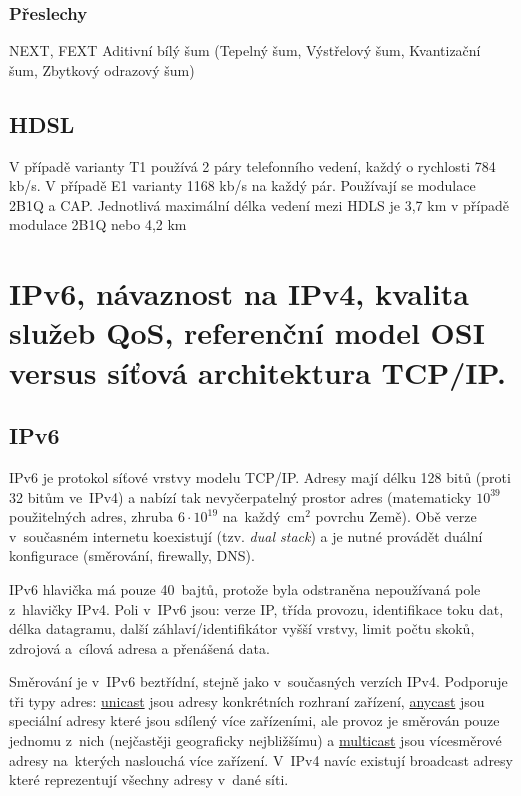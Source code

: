 \subsubsection{Přeslechy}
NEXT, FEXT
Aditivní bílý šum (Tepelný šum, Výstřelový šum, Kvantizační šum, Zbytkový odrazový šum)

\subsection{HDSL}
V případě varianty T1 používá 2 páry telefonního vedení, každý o rychlosti 784 kb/s. V případě E1 varianty 1168 kb/s na každý pár. Používají se modulace 2B1Q a CAP. Jednotlivá maximální délka vedení mezi HDLS je 3,7 km v případě modulace 2B1Q nebo 4,2 km


\clearpage
\section{IPv6, návaznost na IPv4, kvalita služeb QoS, referenční model OSI versus síťová architektura TCP/IP.}


\subsection{IPv6}

IPv6 je protokol síťové vrstvy modelu TCP/IP.
Adresy mají délku 128 bitů (proti 32 bitům ve~IPv4) a nabízí tak nevyčerpatelný prostor adres (matematicky $10^{39}$ použitelných adres, zhruba $6 \cdot 10^{19}$ na~každý~cm$^2$ povrchu Země).
Obě verze v~současném internetu koexistují (tzv. \emph{dual stack}) a je nutné provádět duální konfigurace (směrování, firewally, DNS).

IPv6 hlavička má pouze 40~bajtů, protože byla odstraněna nepoužívaná pole z~hlavičky IPv4.
Poli v~IPv6 jsou: verze IP, třída provozu, identifikace toku dat, délka datagramu, další záhlaví/identifikátor vyšší vrstvy, limit počtu skoků, zdrojová a~cílová adresa a přenášená data.

Směrování je v~IPv6 beztřídní, stejně jako v~současných verzích IPv4.
Podporuje tři typy adres: \underline{unicast} jsou adresy konkrétních rozhraní zařízení, \underline{anycast} jsou speciální adresy které jsou sdílený více zařízeními, ale provoz je směrován pouze jednomu z~nich (nejčastěji geograficky nejbližšímu) a \underline{multicast} jsou vícesměrové adresy na~kterých naslouchá více zařízení.
V~IPv4 navíc existují broadcast adresy které reprezentují všechny adresy v~dané síti.


